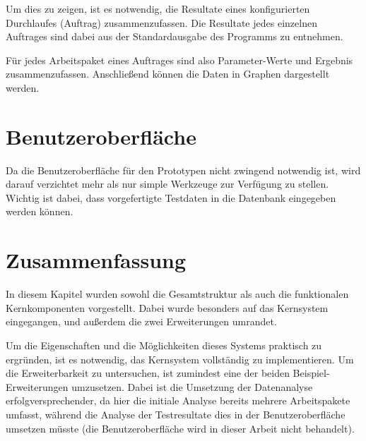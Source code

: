 Um dies zu zeigen, ist es notwendig, die Resultate
eines konfigurierten Durchlaufes (Auftrag) zusammenzufassen.
Die Resultate jedes einzelnen Auftrages sind dabei aus der Standardausgabe
des Programms zu entnehmen.

Für jedes Arbeitspaket eines Auftrages sind also Parameter-Werte und Ergebnis zusammenzufassen.
Anschließend können die Daten in Graphen dargestellt werden.


\section{Benutzeroberfläche}
\label{sec:design:ui}

Da die Benutzeroberfläche für den Prototypen nicht zwingend notwendig ist,
wird darauf verzichtet mehr als nur simple Werkzeuge zur Verfügung zu stellen.
Wichtig ist dabei, dass vorgefertigte Testdaten in die Datenbank eingegeben werden können.


\section{Zusammenfassung}
\label{sec:design:zusammenfassung}

In diesem Kapitel wurden sowohl die Gesamtstruktur als auch die funktionalen Kernkomponenten vorgestellt.
Dabei wurde besonders auf das Kernsystem eingegangen,
und außerdem die zwei Erweiterungen umrandet.

Um die Eigenschaften und die Möglichkeiten dieses Systems praktisch zu ergründen, ist es notwendig, das Kernsystem vollständig zu implementieren.
Um die Erweiterbarkeit zu untersuchen, ist zumindest eine der beiden Beispiel-Erweiterungen umzusetzen. Dabei ist die Umsetzung
der Datenanalyse erfolgversprechender, da hier die initiale Analyse bereits mehrere Arbeitspakete umfasst, während die Analyse der Testresultate dies in der Benutzeroberfläche umsetzen müsste (die Benutzeroberfläche wird in dieser Arbeit nicht behandelt).
